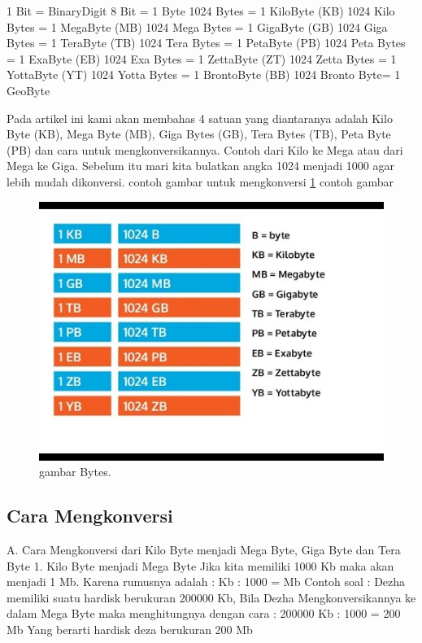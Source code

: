 1 Bit = BinaryDigit
8 Bit = 1 Byte
1024 Bytes = 1 KiloByte (KB)
1024 Kilo Bytes = 1 MegaByte (MB)
1024 Mega Bytes = 1 GigaByte (GB)
1024 Giga Bytes = 1 TeraByte (TB)
1024 Tera Bytes = 1 PetaByte (PB)
1024 Peta Bytes = 1 ExaByte (EB)
1024 Exa Bytes = 1 ZettaByte (ZT)
1024 Zetta Bytes = 1 YottaByte (YT)
1024 Yotta Bytes = 1 BrontoByte (BB)
1024 Bronto Byte= 1 GeoByte

Pada artikel ini kami akan membahas 4 satuan yang diantaranya adalah Kilo Byte (KB), Mega Byte (MB), Giga Bytes (GB), Tera Bytes (TB), Peta Byte (PB) dan cara untuk mengkonversikannya. Contoh dari Kilo ke Mega atau dari Mega ke Giga. 
Sebelum itu mari kita bulatkan angka 1024 menjadi 1000 agar lebih mudah dikonversi. \cite{menon1999nanotechnology}
contoh gambar untuk mengkonversi 
\ref{Bytes.JPG}
contoh gambar

\begin{figure}[ht]
\centerline{\includegraphics[width=1\textwidth]{figures/Bytes.JPG}}
\caption{gambar Bytes.}
\label{Bytes.JPG}
\end{figure}

\subsection {Cara Mengkonversi}
A.	Cara Mengkonversi dari Kilo Byte menjadi Mega Byte, Giga Byte dan Tera Byte
1.	Kilo Byte menjadi Mega Byte
Jika kita memiliki 1000 Kb maka akan menjadi 1 Mb. Karena rumusnya adalah :
Kb : 1000 = Mb
Contoh soal :
Dezha memiliki suatu hardisk berukuran 200000 Kb, Bila Dezha Mengkonversikannya ke dalam Mega Byte maka menghitungnya dengan cara :
200000 Kb : 1000 = 200 Mb
Yang berarti hardisk deza berukuran 200 Mb

